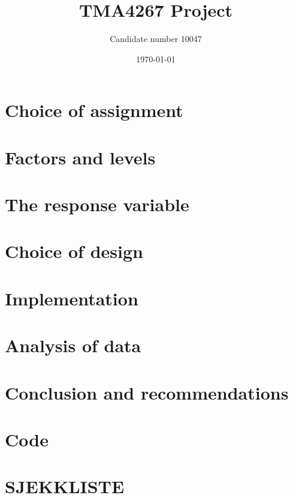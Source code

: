 \documentclass{article}
\title{TMA4267 Project}
\author{Candidate number 10047}
\date{\today}
\begin{document}
\maketitle
\vspace{20mm} %
\begin{abstract}

\end{abstract}
\vspace{20mm} %

\begin{multicols}{2}
\section{Choice of assignment}


\section{Factors and levels}


\section{The response variable}


\section{Choice of design}


\section{Implementation}


\section{Analysis of data}


\section{Conclusion and recommendations}

\end{multicols}

\medskip
\printbibliography[type=book,heading=subbibliography,title={References}]
\printbibliography[nottype=book,heading=subbibliography,title={Other sources}]
\clearpage

\appendix
\section{Code}


\clearpage

\section{SJEKKLISTE}

\end{document}
